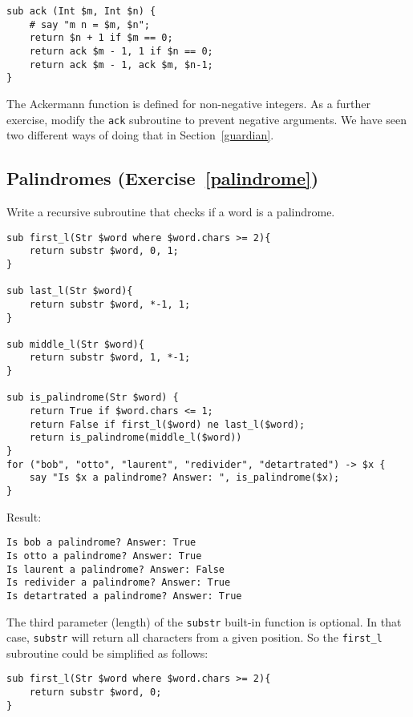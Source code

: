 \begin{verbatim}
sub ack (Int $m, Int $n) {
    # say "m n = $m, $n";
    return $n + 1 if $m == 0;
    return ack $m - 1, 1 if $n == 0;
    return ack $m - 1, ack $m, $n-1;
}
\end{verbatim}
%

The Ackermann function is defined for non-negative integers. 
As a further exercise, modify the {\tt ack} subroutine to 
prevent negative arguments. We have seen two different ways 
of doing that in Section~\ref{guardian}.


\subsection{Palindromes (Exercise~\ref{palindrome})}
\label{sol_palindrome}

Write a recursive subroutine that checks if a word is a 
palindrome.

\begin{verbatim}
sub first_l(Str $word where $word.chars >= 2){
    return substr $word, 0, 1;
}

sub last_l(Str $word){
    return substr $word, *-1, 1;
}

sub middle_l(Str $word){
    return substr $word, 1, *-1;
}

sub is_palindrome(Str $word) {
    return True if $word.chars <= 1;
    return False if first_l($word) ne last_l($word);
    return is_palindrome(middle_l($word))
}
for ("bob", "otto", "laurent", "redivider", "detartrated") -> $x {
    say "Is $x a palindrome? Answer: ", is_palindrome($x);
}
\end{verbatim}

Result:
\begin{verbatim}
Is bob a palindrome? Answer: True
Is otto a palindrome? Answer: True
Is laurent a palindrome? Answer: False
Is redivider a palindrome? Answer: True
Is detartrated a palindrome? Answer: True
\end{verbatim}

The third parameter (length) of the {\tt substr} built-in 
function is optional. In that case, {\tt substr} will return 
all characters from a given position. So the \verb'first_l'  
subroutine could be simplified as follows:

\begin{verbatim}
sub first_l(Str $word where $word.chars >= 2){
    return substr $word, 0;
}
\end{verbatim} 

